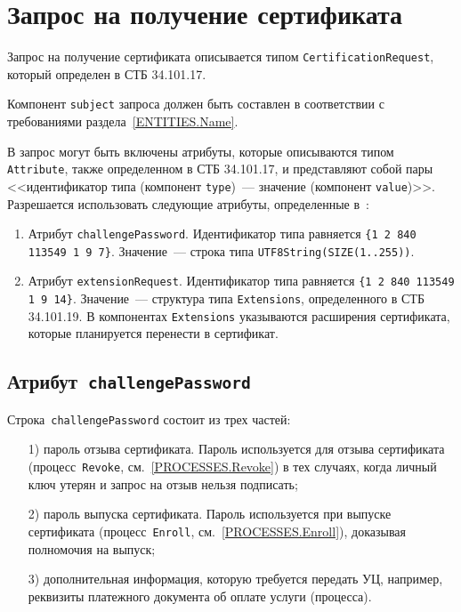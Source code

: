 \section{Запрос на получение сертификата}\label{FMT.CSR}

Запрос на получение сертификата описывается типом 
\texttt{CertificationRequest}, который определен в СТБ 34.101.17.

Компонент \texttt{subject} запроса должен быть составлен в соответствии
с требованиями раздела~\ref{ENTITIES.Name}.

В запрос могут быть включены атрибуты, которые описываются типом 
\texttt{Attribute}, также определенном в СТБ 34.101.17,
и представляют собой пары <<идентификатор типа (компонент \texttt{type})~---
значение (компонент \texttt{value})>>. Разрешается использовать следующие 
атрибуты, определенные в~\cite{PKCS9}:
\begin{enumerate}
\item
Атрибут \texttt{challengePassword}.
Идентификатор типа равняется \verb|{1 2 840 113549 1 9 7}|.
Значение~--- строка типа \verb|UTF8String(SIZE(1..255))|.

\item
Атрибут \texttt{extensionRequest}.
Идентификатор типа равняется \verb|{1 2 840 113549 1 9 14}|.
Значение~--- структура типа \verb|Extensions|, определенного в СТБ 34.101.19.
В компонентах \verb|Extensions| указываются расширения сертификата,
которые планируется перенести в сертификат.
\end{enumerate}

\subsection{Атрибут~\texttt{challengePassword}}\label{FMT.CSR.CP}

Строка~\texttt{challengePassword} состоит из трех частей:
\begin{enumerate} 
\item[1)]
пароль отзыва сертификата. Пароль используется для отзыва сертификата
(процесс~\texttt{Revoke}, см.~\ref{PROCESSES.Revoke})
в тех случаях, когда личный ключ утерян и запрос на отзыв нельзя 
подписать;
\item[2)]
пароль выпуска сертификата. Пароль используется при выпуске сертификата
(процесс~\texttt{Enroll}, см.~\ref{PROCESSES.Enroll}),
доказывая полномочия на выпуск;
\item[3)]
дополнительная информация, которую требуется передать УЦ,
например, реквизиты платежного документа об оплате услуги (процесса).
\end{enumerate}

